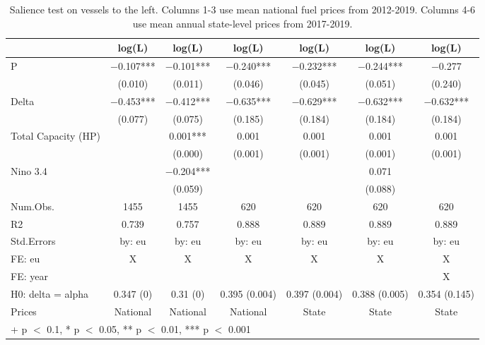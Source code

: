 \begin{table}

\caption{\label{tab:}Salience test on vessels to the left.
             Columns 1-3 use mean national fuel prices from 2012-2019.
             Columns 4-6 use mean annual state-level prices from 2017-2019.}
\centering
\begin{tabular}[t]{lcccccc}
\toprule
  & log(L) & log(L)  & log(L)   & log(L)    & log(L)     & log(L)     \\
\midrule
P & \num{-0.107}*** & \num{-0.101}*** & \num{-0.240}*** & \num{-0.232}*** & \num{-0.244}*** & \num{-0.277}\\
 & (\num{0.010}) & (\num{0.011}) & (\num{0.046}) & (\num{0.045}) & (\num{0.051}) & (\num{0.240})\\
Delta & \num{-0.453}*** & \num{-0.412}*** & \num{-0.635}*** & \num{-0.629}*** & \num{-0.632}*** & \num{-0.632}***\\
 & (\num{0.077}) & (\num{0.075}) & (\num{0.185}) & (\num{0.184}) & (\num{0.184}) & (\num{0.184})\\
Total Capacity (HP) &  & \num{0.001}*** & \num{0.001} & \num{0.001} & \num{0.001} & \num{0.001}\\
 &  & (\num{0.000}) & (\num{0.001}) & (\num{0.001}) & (\num{0.001}) & (\num{0.001})\\
Nino 3.4 &  & \num{-0.204}*** &  &  & \num{0.071} & \\
 &  & (\num{0.059}) &  &  & (\num{0.088}) & \\
\midrule
Num.Obs. & \num{1455} & \num{1455} & \num{620} & \num{620} & \num{620} & \num{620}\\
R2 & \num{0.739} & \num{0.757} & \num{0.888} & \num{0.889} & \num{0.889} & \num{0.889}\\
Std.Errors & by: eu & by: eu & by: eu & by: eu & by: eu & by: eu\\
FE: eu & X & X & X & X & X & X\\
FE: year &  &  &  &  &  & X\\
H0: delta = alpha & 0.347 (0) & 0.31 (0) & 0.395 (0.004) & 0.397 (0.004) & 0.388 (0.005) & 0.354 (0.145)\\
Prices & National & National & National & State & State & State\\
\bottomrule
\multicolumn{7}{l}{\rule{0pt}{1em}+ p $<$ 0.1, * p $<$ 0.05, ** p $<$ 0.01, *** p $<$ 0.001}\\
\end{tabular}
\end{table}
